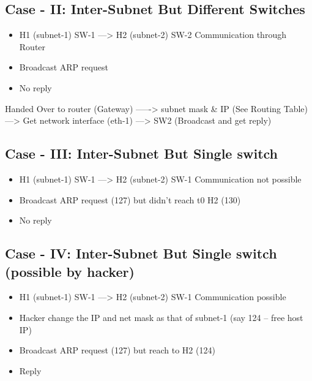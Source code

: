 \documentclass[letterpaper,10pt,english]{sphinxmanual}
\begin{document}
\subsection{Case - II: Inter-Subnet But Different Switches}
\label{week-04:case-ii-inter-subnet-but-different-switches}\begin{itemize}
\item {} 
H1 (subnet-1) SW-1 ---\textgreater{} H2 (subnet-2) SW-2    Communication through Router

\item {} 
Broadcast ARP request

\item {} 
No reply

\end{itemize}

Handed Over to router (Gateway) –----\textgreater{} subnet mask \& IP (See Routing Table) –--\textgreater{} Get network interface (eth-1) –--\textgreater{} SW2 (Broadcast and get reply)


\subsection{Case - III: Inter-Subnet But Single switch}
\label{week-04:case-iii-inter-subnet-but-single-switch}\begin{itemize}
\item {} 
H1 (subnet-1) SW-1 ---\textgreater{} H2 (subnet-2) SW-1    Communication not possible

\item {} 
Broadcast ARP request (127) but didn't reach t0 H2 (130)

\item {} 
No reply

\end{itemize}


\subsection{Case - IV: Inter-Subnet But Single switch (possible by hacker)}
\label{week-04:case-iv-inter-subnet-but-single-switch-possible-by-hacker}\begin{itemize}
\item {} 
H1 (subnet-1) SW-1 ---\textgreater{} H2 (subnet-2) SW-1    Communication  possible

\item {} 
Hacker change the IP and net mask as that of subnet-1 (say 124 – free host IP)

\item {} 
Broadcast ARP request (127) but  reach to H2 (124)

\item {} 
Reply

\end{itemize}
\end{document}
